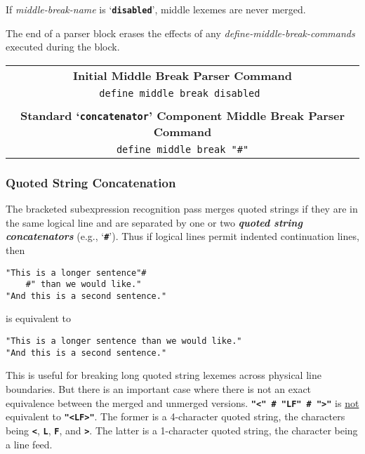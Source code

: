 \documentclass[12pt]{article}
\makeatletter
\newcommand{\TT}[1]{{\tt \bfseries #1}}
\newcommand{\skey}[2]{{\bf \em #1#2}\index{#1}}
\newcommand{\ttkey}[1]{\TT{#1}\index{#1@\TT{#1}}}
\newenvironment{indpar}[1][0.3in]%
	{\begin{list}{}%
		     {\setlength{\itemsep}{0in}%
		      \setlength{\topsep}{0in}%
		      \setlength{\parsep}{1ex}%
		      \setlength{\labelwidth}{#1}%
		      \setlength{\leftmargin}{#1}%
		      \addtolength{\leftmargin}{\labelsep}}%
	 \item}%
	{\end{list}}
\makeatother
\begin{document}
If {\em middle-break-name} is `\TT{disabled}', middle lexemes
are never merged.

The end of a parser block erases the effects of any
{\em define-middle-break-commands} executed during the block.

\begin{center}
\begin{tabular}{c}
\bf Initial Middle Break Parser Command
\\[1ex]
\tt define middle break disabled \\
\\[2ex]
\bf Standard `\ttkey{concatenator}'\label{STANDARD-CONCATENATOR-1} Component
    Middle Break Parser Command
\\[1ex]
\tt define middle break "\#"
\end{tabular}
\end{center}

\subsubsection{Quoted String Concatenation}
\label{QUOTED-STRING-CONCATENATION}

The bracketed subexpression recognition pass merges
quoted strings if they are in the same logical line and are
separated by one or two \skey{quoted string concatenator}s (e.g., `\TT{\#}').
Thus if logical lines permit indented continuation lines, then
\begin{indpar}\begin{verbatim}
"This is a longer sentence"#
    #" than we would like."
"And this is a second sentence."
\end{verbatim}\end{indpar}
is equivalent to
\begin{indpar}\begin{verbatim}
"This is a longer sentence than we would like."
"And this is a second sentence."
\end{verbatim}\end{indpar}
This is useful for
breaking long quoted string lexemes across physical line boundaries.
But there is an important case where there is not an exact equivalence
between the merged and unmerged versions.  \TT{"<" \# "LF" \# ">"} is
\underline{not} equivalent to \TT{"<LF>"}.  The former is a 4-character
quoted string, the characters being \TT{<}, \TT{L}, \TT{F},
and \TT{>}.  The latter is a 1-character quoted string, the character
being a line feed.
\end{document}
